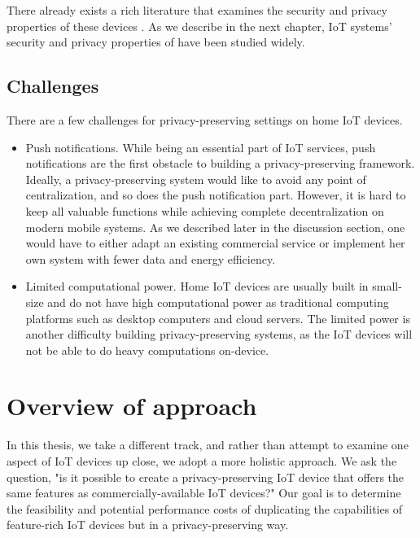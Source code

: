 There already exists a rich literature that examines the security and privacy properties of these devices \cite{acar2016sok} \cite{hilt2019internet} \cite{shumailov2019hearing} \cite{apthorpe2017smart}. As we describe in the next chapter, IoT systems' security and privacy properties of have been studied widely.


\subsection{Challenges}

There are a few challenges for privacy-preserving settings on home IoT devices. 

\begin{itemize}
	\item Push notifications. While being an essential part of IoT services, push notifications are the first obstacle to building a privacy-preserving framework. Ideally, a privacy-preserving system would like to avoid any point of centralization, and so does the push notification part. However, it is hard to keep all valuable functions while achieving complete decentralization on modern mobile systems. As we described later in the discussion section, one would have to either adapt an existing commercial service or implement her own system with fewer data and energy efficiency.
	\item Limited computational power. Home IoT devices are usually built in small-size and do not have high computational power as traditional computing platforms such as desktop computers and cloud servers. The limited power is another difficulty building privacy-preserving systems, as the IoT devices will not be able to do heavy computations on-device.
\end{itemize}

\section{Overview of approach}

In this thesis, we take a different track, and rather than attempt to examine one aspect of IoT devices up close, we adopt a more holistic approach. We ask the question, "is it possible to create a privacy-preserving IoT device that offers the same features as commercially-available IoT devices?" Our goal is to determine the feasibility and potential performance costs of duplicating the capabilities of feature-rich IoT devices but in a privacy-preserving way.

